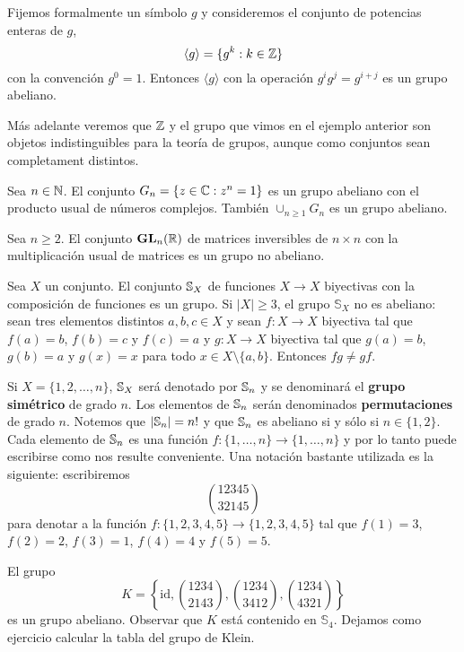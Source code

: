 \begin{example}
Fijemos formalmente un símbolo $g$ y 
consideremos el conjunto de potencias enteras de $g$, 
\[
\langle g\rangle=\{g^k:k\in\mathbb{Z}\}
\]
con la convención $g^0=1$. Entonces $\langle g\rangle$ 
con la operación $g^ig^j=g^{i+j}$ es un grupo abeliano. 
\end{example}

Más adelante veremos que $\mathbb{Z}$ y el grupo que vimos en el ejemplo anterior son objetos indistinguibles para la teoría de grupos, aunque como conjuntos sean completament distintos.  

\begin{example}
	Sea $n\in\mathbb{N}$. El conjunto $G_n=\{z\in\mathbb{C}:z^n=1\}$ es un grupo abeliano con
	el producto usual de números complejos.	También 
	$\cup_{n\geq1}G_n$ es un grupo abeliano.
\end{example}

\begin{example}
	Sea $n\geq2$.  El conjunto $\mathbf{GL}_n(\mathbb{R})$ de matrices inversibles de $n\times
	n$ con la multiplicación usual de matrices es un grupo no abeliano. 
\end{example}

\begin{example}
	Sea $X$ un conjunto. El conjunto $\mathbb{S}_X$ de funciones $X\to X$ biyectivas
	con la composición de funciones es un grupo.  Si $|X|\geq3$, el grupo
	$\mathbb{S}_{X}$ no es abeliano: sean tres elementos distintos $a,b,c\in
	X$ y sean $f\colon X\to X$ biyectiva tal que $f(a)=b$, $f(b)=c$ y $f(c)=a$ y $g\colon X\to
	X$ biyectiva tal que $g(a)=b$, $g(b)=a$ y $g(x)=x$ para todo $x\in
	X\setminus\{a,b\}$.  Entonces $fg\ne gf$. 
\end{example}

Si $X=\{1,2,\dots,n\}$, $\mathbb{S}_X$ será denotado por $\mathbb{S}_n$ y se denominará el
\textbf{grupo simétrico} de grado $n$. Los elementos de $\mathbb{S}_n$ serán 
denominados \textbf{permutaciones} de grado $n$. 
Notemos que $|\mathbb{S}_n|=n!$ y que $\mathbb{S}_n$
es abeliano si y sólo si $n\in\{1,2\}$. Cada elemento de $\mathbb{S}_n$ es una función
$f\colon\{1,\dots,n\}\to \{1,\dots,n\}$ y por lo tanto puede escribirse como nos resulte conveniente. 
Una notación bastante utilizada es la siguiente: escribiremos
\[
\binom{12345}{32145}
\]
para denotar a la
función $f\colon\{1,2,3,4,5\}\to\{1,2,3,4,5\}$ tal que
$f(1)=3$, $f(2)=2$, $f(3)=1$, $f(4)=4$ y $f(5)=5$. 

\begin{example}
El grupo 
\[
K=\left\{ \mathrm{id},\binom{1234}{2143},\binom{1234}{3412},\binom{1234}{4321}\right\} 
\]
es un grupo abeliano. Observar que $K$ está contenido en $\mathbb{S}_{4}$. 
Dejamos como ejercicio calcular la tabla del grupo de Klein. 
\end{example}

